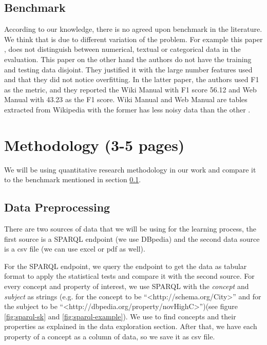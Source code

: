 \documentclass{article}
\newcommand{\comm}[2][inline]{\color{green} #2 \color{black}}
\begin{document}
\subsection{Benchmark}\label{benchmark-sec}
According to our knowledge, there is no agreed upon benchmark in the literature. We think that is due to different variation of the problem. For example this paper \cite{karma}, does not distinguish between numerical, textual or categorical data in the evaluation. This paper on the other hand \cite{ann-ser-webtables} the authors do not have the training and testing data disjoint. They justified it with the large number features used and that they did not notice overfitting. In the latter paper, the authors used F1 as the metric, and they reported the Wiki Manual with F1 score 56.12 and Web Manual with 43.23 as the F1 score. Wiki Manual and Web Manual are tables extracted from Wikipedia with the former has less noisy data than the other \cite{ann-ser-webtables}.



\section{Methodology (3-5 pages)}
We will be using quantitative research methodology in our work and compare it to the benchmark mentioned in section \ref{benchmark-sec}. %

\subsection{Data Preprocessing} \label{datapreprocessing-sec}



There are two sources of data that we will be using for the learning process, the first source is a SPARQL endpoint \cite{w3c-sparql} (we use DBpedia) and the second data source is a csv file (we can use excel or pdf as well). 

For the SPARQL endpoint, we query the endpoint to get the data as tabular format to apply the statistical tests and compare it with the second source. For every concept and property of interest,%
we use SPARQL with the \textit{concept} and \textit{subject} as strings (e.g. for the concept to be ``\textless http://schema.org/City\textgreater '' and for the subject to be ``\textless http://dbpedia.org/property/novHighC\textgreater'')(see figure \ref{fig:sparql-sk} and \ref{fig:sparql-example}). We use \cite{loupe} to find concepts and their properties as explained in the data exploration section. After that, we have each property of a concept as a column of data, so we save it as csv file.
\end{document}
